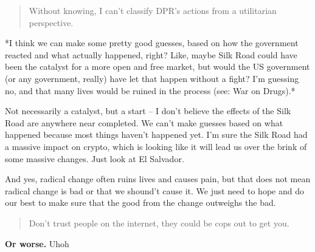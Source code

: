 \documentclass[letterpaper]{article}
\begin{document}
\begin{enumerate}
\begin{quote}
Without knowing, I can't classify DPR's actions from a utilitarian
perspective.
\end{quote}

*I think we can make some pretty good guesses, based on how the
government reacted and what actually happened, right? Like, maybe Silk
Road could have been the catalyst for a more open and free market, but
would the US government (or any government, really) have let that happen
without a fight? I'm guessing no, and that many lives would be ruined in
the process (see: War on Drugs).*

Not necessarily a catalyst, but a start -- I don't believe the effects
of the Silk Road are anywhere near completed. We can't make guesses
based on what happened because most things haven't happened yet. I'm
sure the Silk Road had a massive impact on crypto, which is looking like
it will lead us over the brink of some massive changes. Just look at El
Salvador.

And yes, radical change often ruins lives and causes pain, but that does
not mean radical change is bad or that we shound't cause it. We just
need to hope and do our best to make sure that the good from the change
outweighs the bad.

\begin{quote}
Don't trust people on the internet, they could be cops out to get you.
\end{quote}

\textbf{Or worse.} Uhoh
\end{enumerate}
\end{document}
